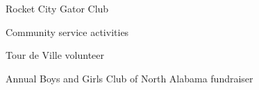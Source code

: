 
\begin{cventries}
  \cventry
    {} {Rocket City Gator Club} {} {} {
      \begin{cvitems}
      \item {Community service activities}
      \end{cvitems}
    }

  \cventry
    {} {Tour de Ville volunteer} {} {} {
      \begin{cvitems}
      \item {Annual Boys and Girls Club of North Alabama fundraiser}
      \end{cvitems}
    }

\end{cventries}
